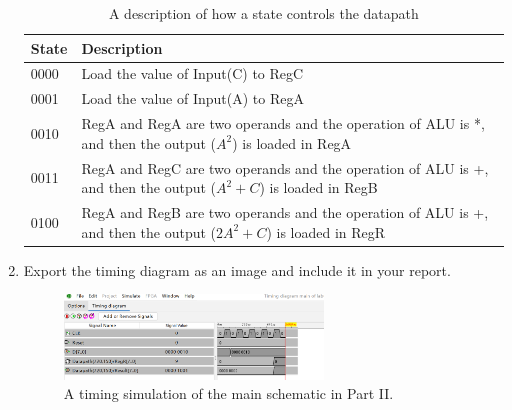 \documentclass{article}
\begin{document}
\begin{enumerate}
\begin{table}[ht!]
\caption{A description of how a state controls the datapath}
\label{t:part2_state_descriptions}
\centering
\begin{tabular}{|l|l|}
\hline
State & Description\\ \hline
0000 & Load the value of Input(C) to RegC\\ \hline
0001 & Load the value of Input(A) to RegA\\ \hline
0010 & RegA and RegA are two operands and the operation of ALU is *, and then the output ($A^2$) is loaded in RegA\\ \hline
0011 & RegA and RegC are two operands and the operation of ALU is +, and then the output ($A^2 + C$) is loaded in RegB\\ \hline
0100 & RegA and RegB are two operands and the operation of ALU is +, and then the output ($2A^2 + C$) is loaded in RegR\\
\hline
\end{tabular}
\end{table}

\item Export the timing diagram as an image and include it in your report.

\begin{figure}[ht!]
    \centering
    \includegraphics[width=0.65\textwidth]{lab6_part2_timing.png}
    \caption{A timing simulation of the main schematic in Part II.}
    \label{f:part2_timing}
\end{figure}

\end{enumerate}
\end{document}
